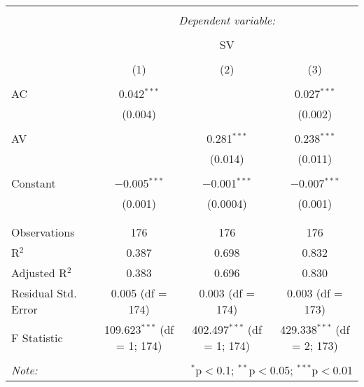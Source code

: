 
\begin{table}[!htbp] \centering 
  \caption{} 
  \label{} 
\begin{tabular}{@{\extracolsep{5pt}}lccc} 
\\[-1.8ex]\hline 
\hline \\[-1.8ex] 
 & \multicolumn{3}{c}{\textit{Dependent variable:}} \\ 
\cline{2-4} 
\\[-1.8ex] & \multicolumn{3}{c}{SV} \\ 
\\[-1.8ex] & (1) & (2) & (3)\\ 
\hline \\[-1.8ex] 
 AC & 0.042$^{***}$ &  & 0.027$^{***}$ \\ 
  & (0.004) &  & (0.002) \\ 
  & & & \\ 
 AV &  & 0.281$^{***}$ & 0.238$^{***}$ \\ 
  &  & (0.014) & (0.011) \\ 
  & & & \\ 
 Constant & $-$0.005$^{***}$ & $-$0.001$^{***}$ & $-$0.007$^{***}$ \\ 
  & (0.001) & (0.0004) & (0.001) \\ 
  & & & \\ 
\hline \\[-1.8ex] 
Observations & 176 & 176 & 176 \\ 
R$^{2}$ & 0.387 & 0.698 & 0.832 \\ 
Adjusted R$^{2}$ & 0.383 & 0.696 & 0.830 \\ 
Residual Std. Error & 0.005 (df = 174) & 0.003 (df = 174) & 0.003 (df = 173) \\ 
F Statistic & 109.623$^{***}$ (df = 1; 174) & 402.497$^{***}$ (df = 1; 174) & 429.338$^{***}$ (df = 2; 173) \\ 
\hline 
\hline \\[-1.8ex] 
\textit{Note:}  & \multicolumn{3}{r}{$^{*}$p$<$0.1; $^{**}$p$<$0.05; $^{***}$p$<$0.01} \\ 
\end{tabular} 
\end{table} 
